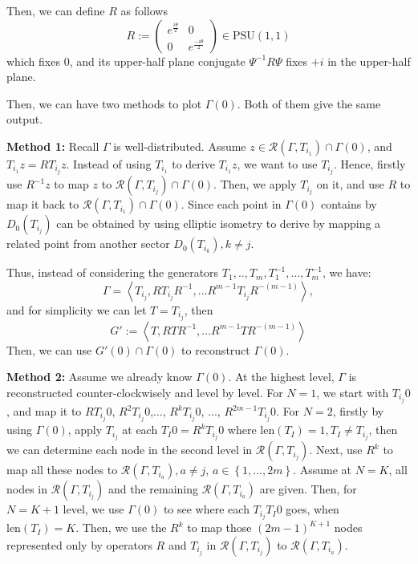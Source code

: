 \documentclass[12pt,oneside]{sfsuthesis}
\theoremstyle{plain} %
\theoremstyle{definition}  %
\theoremstyle{remark}  %
\theoremstyle{plain}
\begin{document}
{Then, we can define $R$ as follows
$$
R:=\begin{pmatrix}
e^{\frac{i\theta}{2}} &  0 \\
0 &  e^{\frac{-i\theta}{2}}
\end{pmatrix}\in\text{PSU}(1,1)
$$ 
which fixes $0$, and its upper-half plane conjugate $\Psi^{-1} R\Psi$ fixes $+i$ in the upper-half plane.

Then, we can have two methods to plot $\Gamma(0)$. Both of them give the same output.

\noindent\textbf{Method 1:}  Recall $\Gamma$ is well-distributed. Assume $z\in\mathcal{R}(\Gamma,T_{i_1})\cap \Gamma(0)$, and $T_{i_1}z=RT_{i_j}z$. Instead of using $T_{i_1}$ to derive $T_{i_1}z$, we want to use $T_{i_j}$. Hence, firstly use $R^{-1}z$ to map $z$ to $\mathcal{R}(\Gamma,T_{i_j})\cap \Gamma(0)$. Then, we apply $T_{i_j}$ on it, and use $R$ to map it back to $\mathcal{R}(\Gamma,T_{i_1})\cap \Gamma(0)$. Since each point in $\Gamma(0)$ contains by $D_0(T_{i_j})$ can be obtained by using elliptic isometry to derive by mapping a related point from another sector $D_0(T_{i_k}), k\neq j$.

Thus, instead of considering the generators $T_1,..,T_m,T_1^{-1},...,T_m^{-1}$, we have:
$$
\Gamma=\left\langle T_{i_j}, RT_{i_j}R^{-1},...R^{m-1}T_{i_j}R^{-(m-1)} \right\rangle,
$$
and for simplicity we can let $T=T_{i_j}$, then
$$
G':=\left\langle T, RTR^{-1},...R^{m-1}TR^{-(m-1)} \right\rangle
$$
Then, we can use $G'(0)\cap \Gamma(0)$ to reconstruct $\Gamma(0)$.




\noindent\textbf{Method 2:} Assume we already know $\Gamma(0)$. At the highest level, $\Gamma$ is reconstructed counter-clockwisely and level by level. For $N=1$, we start with $T_{i_j}0$, and map it to $RT_{i_j}0$, $R^2T_{i_j}0$,..., $R^kT_{i_j}0$, ..., $R^{2m-1}T_{i_j}0$. For $N=2$, firstly by using $\Gamma(0)$, apply $T_{i_j}$ at each $T_I0=R^kT_{i_j}0$ where $\text{len}(T_I)=1, T_I\neq T_{i_j}$, then we can determine each node in the second level in $\mathcal{R}(\Gamma,T_{i_j})$. Next, use $R^k$ to map all these nodes to $\mathcal{R}(\Gamma,T_{i_a}), a\neq j$, $a\in\left\lbrace 1,...,2m \right\rbrace$. Assume at $N=K$, all nodes in $\mathcal{R}(\Gamma,T_{i_j})$ and the remaining $\mathcal{R}(\Gamma,T_{i_a})$ are given. Then, for $N=K+1$ level, we use $\Gamma(0)$ to see where each $T_{i_j}T_I0$ goes, when $\text{len}(T_I)=K$. Then, we use the $R^k$ to map those $(2m-1)^{K+1}$ nodes represented only by operators $R$ and $T_{i_j}$ in $\mathcal{R}(\Gamma,T_{i_j})$ to $\mathcal{R}(\Gamma,T_{i_a})$. 


}
\end{document}
